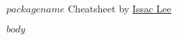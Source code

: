 \documentclass[10pt,quotespacing]{oblivoir}
\begin{document}
\textbf{$packagename$} Cheatsheet by \href{url}{Issac Lee}

\begin{multicols*}{4}

\setlength{\premulticols}{0.25pt}
\setlength{\postmulticols}{0.25pt}
\setlength{\multicolsep}{0.25pt}
\setlength{\columnsep}{0.25pt}

\tiny

\begin{tcolorbox}

$body$

\end{tcolorbox}

\end{multicols*}
\end{document}
